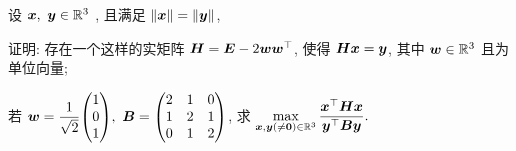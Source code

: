 \begin{example}
  设 $\vb*{x},~\vb*{y}\in \mathbb{R}^{3}$ , 且满足 $\norm{\vb*{x}}=\norm{\vb*{y}}$,
  \begin{enumerate*}[label=(\Roman{*})]
    \item 证明: 存在一个这样的实矩阵 $\vb*{H}=\vb*{E}-2\vb*{ww}^\top$, 使得 $\vb*{Hx}=\vb*{y}$, 其中 $\vb*{w}\in \mathbb{R}^{3}$ 且为单位向量;
    \item 若 $\vb*{w}=\dfrac{1}{\sqrt{2}}\mqty(1\\0\\1),~\vb*{B}=\begin{pmatrix} 2 & 1 & 0 \\ 1 & 2 & 1 \\ 0 & 1 & 2 \\\end{pmatrix}$, 求 $\displaystyle \max_{\vb*{x},\vb*{y}(\neq\vb*{0})\in \mathbb{R}^{3}}\dfrac{\vb*{x}^\top\vb*{Hx}}{\vb*{y}^\top\vb*{By}}.$
  \end{enumerate*}
\end{example}
